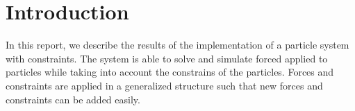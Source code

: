 \section{Introduction}
In this report, we describe the results of the implementation of a particle system with constraints. The system is able to solve and simulate forced applied to particles while taking into account the constrains of the particles. Forces and constraints are applied in a generalized structure such that new forces and constraints can be added easily.